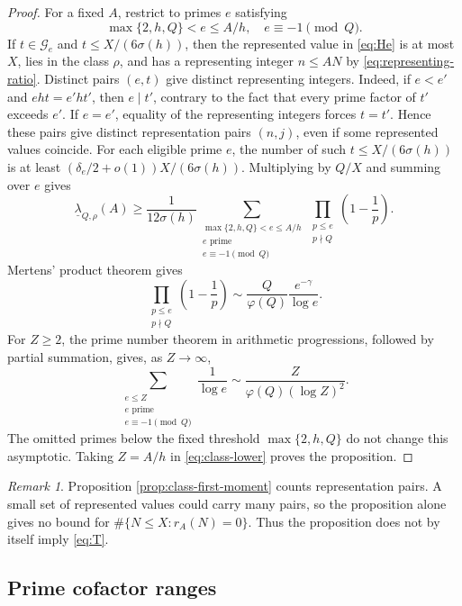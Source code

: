 \documentclass[11pt,letterpaper,reqno]{amsart}
\numberwithin{equation}{section}
\theoremstyle{remark}
\newtheorem{remark}[theorem]{Remark}
\newcommand{\1}{\mathbf 1}
\renewcommand{\leq}{\leqslant}
\renewcommand{\geq}{\geqslant}
\begin{document}
\begin{proof}
For a fixed $A$, restrict to primes $e$ satisfying
\[
 \max\{2,h,Q\}<e\leq A/h,
 \quad e\equiv-1\pmod Q.
\]
If $t\in\mathcal{G}_e$ and $t\leq X/(6\sigma(h))$, then the represented value in
\eqref{eq:He} is at most $X$, lies in the class $\rho$, and has a representing integer
$n\leq AN$ by \eqref{eq:representing-ratio}. Distinct pairs $(e,t)$ give
distinct representing integers. Indeed, if $e<e'$ and $eht=e'ht'$, then $e\mid t'$,
contrary to the fact that every prime factor of $t'$ exceeds $e'$. If
$e=e'$, equality of the representing integers forces $t=t'$. Hence these pairs give distinct representation pairs $(n,j)$, even if some
represented values coincide. For each eligible prime $e$, the number of
such $t\leq X/(6\sigma(h))$ is at least
$(\delta_e/2+o(1))X/(6\sigma(h))$. Multiplying by $Q/X$ and summing over
$e$ gives
\begin{equation}\label{eq:class-lower}
 \underline{\lambda}_{Q,\rho}(A)
 \geq\frac1{12\sigma(h)}
 \sum_{\substack{\max\{2,h,Q\}<e\leq A/h\\
 e\text{ prime}\\e\equiv-1\pmod Q}}
 \prod_{\substack{p\leq e\\p\nmid Q}}\left(1-\frac1p\right).
\end{equation}
Mertens' product theorem gives
\[
 \prod_{\substack{p\leq e\\p\nmid Q}}
 \left(1-\frac1p\right)
 \sim\frac Q{\varphi(Q)}\frac{e^{-\gamma}}{\log e}.
\]
For $Z\geq2$, the prime number theorem in arithmetic progressions, followed
by partial summation, gives, as $Z\to\infty$,
\[
 \sum_{\substack{e\leq Z\\e\text{ prime}\\e\equiv-1\pmod Q}}
 \frac1{\log e}
 \sim\frac{Z}{\varphi(Q)(\log Z)^2}.
\]
The omitted primes below the fixed threshold $\max\{2,h,Q\}$ do not
change this asymptotic. Taking $Z=A/h$ in \eqref{eq:class-lower} proves the
proposition.
\end{proof}

\begin{remark}
Proposition \ref{prop:class-first-moment} counts representation pairs. A small set
of represented values could carry many pairs, so the proposition alone gives no bound
for $\#\{N\leq X:r_A(N)=0\}$. Thus the proposition does not by itself imply
\eqref{eq:T}.
\end{remark}

\subsection{Prime cofactor ranges}
\end{document}
